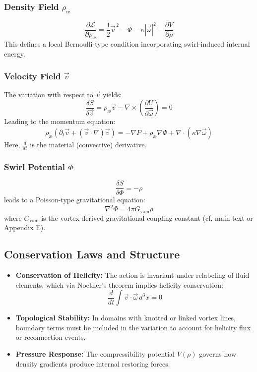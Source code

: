 \subsubsection*{Density Field $\rho_\text{\ae}$}
\begin{equation}
    \frac{\partial \mathcal{L}}{\partial \rho_\text{\ae}} = \frac{1}{2} \vec{v}^{\,2} - \Phi - \kappa |\vec{\omega}|^2 - \frac{\partial V}{\partial \rho}
\end{equation}
This defines a local Bernoulli-type condition incorporating swirl-induced internal energy.

\subsubsection*{Velocity Field $\vec{v}$}
The variation with respect to $\vec{v}$ yields:
\begin{equation}
    \frac{\delta S}{\delta \vec{v}} = \rho_\text{\ae}\vec{v} - \nabla \times \left( \frac{\partial U}{\partial \vec{\omega}} \right) = 0
\end{equation}
Leading to the momentum equation:
\begin{equation}
    \rho_\text{\ae}\left( \partial_t \vec{v} + (\vec{v} \cdot \nabla)\vec{v} \right) = -\nabla P + \rho_\text{\ae}\nabla \Phi + \nabla \cdot \left( \kappa \nabla \vec{\omega} \right)
\end{equation}
Here, $\frac{d}{dt}$ is the material (convective) derivative.

\subsubsection*{Swirl Potential $\Phi$}
\begin{equation}
    \frac{\delta S}{\delta \Phi} = -\rho
\end{equation}
leads to a Poisson-type gravitational equation:
\begin{equation}
    \nabla^2 \Phi = 4\pi G_{\mathrm{vam}} \rho
\end{equation}
where $G_{\mathrm{vam}}$ is the vortex-derived gravitational coupling constant (cf. main text or Appendix E).

\subsection*{Conservation Laws and Structure}
\begin{itemize}
    \item \textbf{Conservation of Helicity:}
    The action is invariant under relabeling of fluid elements, which via Noether's theorem implies helicity conservation:
    \[
        \frac{d}{dt} \int \vec{v} \cdot \vec{\omega} \, d^3x = 0
    \]
    \item \textbf{Topological Stability:} In domains with knotted or linked vortex lines, boundary terms must be included in the variation to account for helicity flux or reconnection events.
    \item \textbf{Pressure Response:} The compressibility potential $V(\rho)$ governs how density gradients produce internal restoring forces.
\end{itemize}

